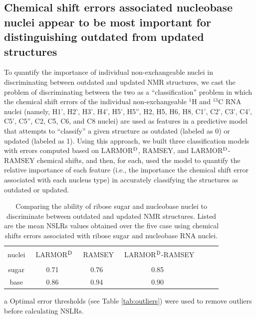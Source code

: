 \documentclass[fleqn,10pt]{wlscirep}
\begin{document}
\subsection*{Chemical shift errors associated nucleobase nuclei appear to be most important  for distinguishing outdated from updated structures}
To quantify the importance of individual non-exchangeable nuclei in discriminating between outdated and updated NMR structures, we cast the problem of discriminating between the two as a ``classification'' problem in which the chemical shift errors of the individual non-exchangeable $^{1}$H and $^{13}$C RNA nuclei (namely, H1', H2', H3', H4', H5', H5'', H2, H5, H6, H8, C1', C2', C3', C4', C5', C5'', C2, C5, C6,  and C8 nuclei) are used as features in a predictive model that attempts to ``classify'' a given structure as outdated (labeled as 0) or updated (labeled as 1). Using this approach, we built three classification models with errors computed based on LARMOR$^{\rm D}$,  RAMSEY, and  LARMOR$^{\rm D}$-RAMSEY chemical shifts, and then, for each,  used the model to quantify the relative importance of each feature (i.e., the importance the chemical shift error associated with each nucleus type) in accurately classifying the structures as outdated or updated. 

\begin{table}[h]
\centering
\begin{threeparttable}
\begin{tabular}{c c c c c c c }
\hline
\\
nuclei & \tnote{a} \ LARMOR$^{\rm D}$ & \tnote{a} \ RAMSEY & \tnote{a} \ LARMOR$^{\rm D}$-RAMSEY  \\
\\
\hline
sugar & 0.71& 0.76 & 0.85  \\
base  & 0.86 & 0.94 & 0.90  \\
\hline
\end{tabular}
\begin{tablenotes}
\item[a] Optimal error thresholds (see Table \ref{tab:outliers}) were used to remove outliers before calculating NSLRs.
\end{tablenotes}
\end{threeparttable}
\caption{\label{tab:test} Comparing the ability of ribose sugar and nucleobase nuclei to discriminate between outdated and updated NMR structures. Listed are the mean NSLRs values obtained over the five case using chemical shifts errors associated with ribose sugar and nucleobase RNA nuclei.}
\end{table}
\end{document}
